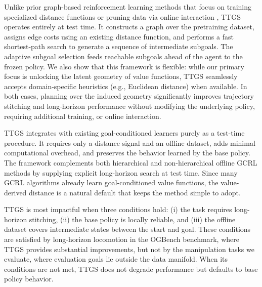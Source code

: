\documentclass{article} %
\begin{document}
Unlike prior graph-based reinforcement learning methods that focus on training specialized distance functions or pruning data via online interaction \citep{emmos2020sparsegraphical}, TTGS operates entirely at test time. It constructs a graph over the pretraining dataset, assigns edge costs using an existing distance function, and performs a fast shortest-path search to generate a sequence of intermediate subgoals. The adaptive subgoal selection feeds reachable subgoals ahead of the agent to the frozen policy.  We also show that this framework is flexible: while our primary focus is unlocking the latent geometry of value functions, TTGS seamlessly accepts domain-specific heuristics (e.g., Euclidean distance) when available. In both cases, planning over the induced geometry significantly improves trajectory stitching and long-horizon performance without modifying the underlying policy, requiring additional training, or online interaction.

TTGS integrates with existing goal-conditioned learners purely as a test-time procedure. It requires only a distance signal and an offline dataset, adds minimal computational overhead, and preserves the behavior learned by the base policy. The framework complements both hierarchical and non-hierarchical offline GCRL methods by supplying explicit long-horizon search at test time. Since many GCRL algorithms already learn goal-conditioned value functions, the value-derived distance is a natural default that keeps the method simple to adopt.

TTGS is most impactful when three conditions hold: (i) the task requires long-horizon stitching, (ii) the base policy is locally reliable, and (iii) the offline dataset covers intermediate states between the start and goal. These conditions are satisfied by long-horizon locomotion in the OGBench benchmark, where TTGS provides substantial improvements, but not by the manipulation tasks we evaluate, where evaluation goals lie outside the data manifold. When its conditions are not met, TTGS does not degrade performance but defaults to base policy behavior.
\end{document}
